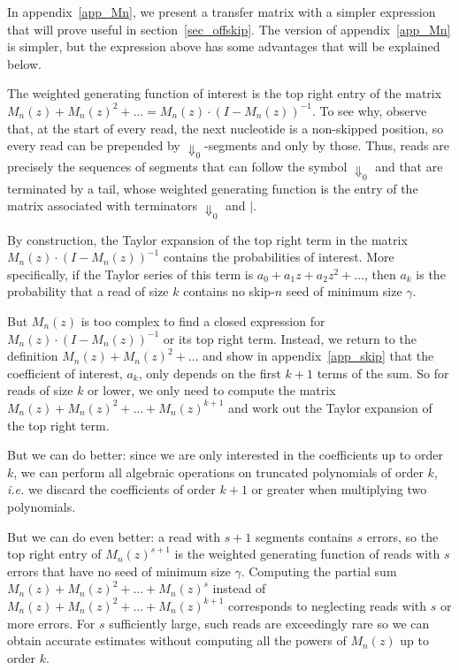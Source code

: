 \documentclass{article}
\begin{document}
In appendix~\ref{app_Mn}, we present a transfer matrix with a simpler
expression that will prove useful in section~\ref{sec_offskip}. The
version of appendix~\ref{app_Mn} is simpler, but the expression above has
some advantages that will be explained below.

The weighted generating function of interest is the top right entry of the
matrix $M_n(z) + M_n(z)^2 + \ldots = M_n(z)\cdot(I-M_n(z))^{-1}$. To see
why, observe that, at the start of every read, the next nucleotide is a
non-skipped position, so every read can be prepended by
$\Downarrow_0$-segments and only by those. Thus, reads are precisely the
sequences of segments that can follow the symbol $\Downarrow_0$ and that
are terminated by a tail, whose weighted generating function is the entry
of the matrix associated with terminators $\Downarrow_0$ and $|$.

By construction, the Taylor expansion of the top right term in the matrix
$M_n(z)\cdot(I-M_n(z))^{-1}$ contains the probabilities of interest. More
specifically, if the Taylor series of this term is $a_0 + a_1 z + a_2 z^2
+ \ldots$, then $a_k$ is the probability that a read of size $k$ contains
no skip-$n$ seed of minimum size $\gamma$.

But $M_n(z)$ is too complex to find a closed expression for $M_n(z) \cdot
(I-M_n(z))^{-1}$ or its top right term. Instead, we return to the
definition $M_n(z) + M_n(z)^2 + \ldots$ and show in
appendix~\ref{app_skip} that the coefficient of interest, $a_k$, only
depends on the first $k+1$ terms of the sum. So for reads of size $k$ or
lower, we only need to compute the matrix $M_n(z) + M_n(z)^2 + \ldots +
M_n(z)^{k+1}$ and work out the Taylor expansion of the top right term.

But we can do better: since we are only interested in the coefficients up
to order $k$, we can perform all algebraic operations on truncated
polynomials of order $k$, \textit{i.e.} we discard the coefficients of
order $k+1$ or greater when multiplying two polynomials.

But we can do even better: a read with $s+1$ segments contains $s$ errors,
so the top right entry of $M_n(z)^{s+1}$ is the weighted generating
function of reads with $s$ errors that have no seed of minimum size
$\gamma$. Computing the partial sum $M_n(z) + M_n(z)^2 + \ldots +
M_n(z)^s$ instead of $M_n(z) + M_n(z)^2 + \ldots + M_n(z)^{k+1}$
corresponds to neglecting reads with $s$ or more errors. For $s$
sufficiently large, such reads are exceedingly rare so we can obtain
accurate estimates without computing all the powers of $M_n(z)$ up to
order $k$.
\end{document}
